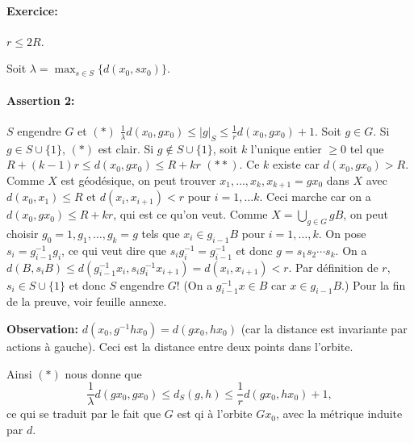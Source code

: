 \begin{preuve}
    \paragraph{Exercice:} $r \leq 2R$.

    Soit $\lambda = \max_{s \in S}\{d(x_0, sx_0)\}$.

    \paragraph{Assertion 2:} $S$ engendre $G$ et $(\ast)$ $\frac{1}{\lambda} d(x_0, gx_0) \leq |g|_S \leq
    \frac{1}{r}d(x_0, gx_0) + 1$. Soit $g \in G$. Si $g \in S \cup \{1\}$, $(\ast)$ est clair. Si $g \notin S
    \cup \{1\}$, soit $k$ l'unique entier $\geq 0$ tel que $R + (k-1)r \leq d(x_0, gx_0) \leq R + kr$
    $(\ast\ast)$. Ce $k$ existe car $d(x_0, gx_0) > R$. Comme $X$ est géodésique, on peut trouver $x_1,
    \ldots, x_k, x_{k+1} = gx_0$ dans $X$ avec $d(x_0, x_1) \leq R$ et $d(x_i, x_{i+1}) < r$ pour $i = 1,
    \ldots k$. Ceci marche car on a $d(x_0, gx_0) \leq R + kr$, qui est ce qu'on veut. Comme $X = \bigcup_{g
      \in G} gB$, on peut choisir $g_0 = 1, g_1, \ldots, g_k = g$ tels que $x_i \in g_{i-1}B$ pour $i = 1,
    \ldots, k$. On pose $s_i = g_{i-1}^{-1}g_i$, ce qui veut dire que $s_ig_i^{-1} = g_{i-1}^{-1}$ et donc $g = s_1s_2\cdots s_k$. On a $d(B, s_iB) \leq
    d(g_{i-1}^{-1}x_i, s_ig_i^{-1}x_{i+1}) = d(x_i, x_{i+1}) < r$. Par définition de $r$, $s_i \in S \cup
    \{1\}$ et donc $S$ engendre $G$! (On a $g_{i-1}^{-1} x \in B$ car $x \in g_{i-1}B$.) Pour la fin de la
    preuve, voir feuille annexe.

    \textbf{Observation:} $d(x_0, g^{-1}hx_0) = d(gx_0, hx_0)$ (car la distance est invariante par actions à
    gauche). Ceci est la distance entre deux points dans l'orbite.

    Ainsi $(\ast)$ nous donne que
      \[\frac{1}{\lambda} d(gx_0, gx_0) \leq d_S(g, h) \leq \frac{1}{r} d(gx_0, hx_0) + 1,\]
    ce qui se traduit par le fait que $G$ est qi à l'orbite $Gx_0$, avec la métrique induite par $d$.


\end{preuve}
